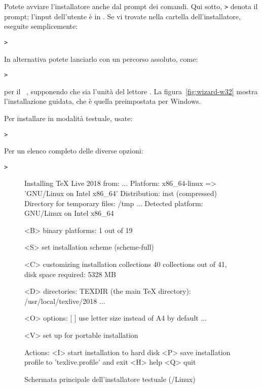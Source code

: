 \documentclass{article}
\begin{document}
Potete avviare l'installatore anche dal prompt dei comandi. Qui sotto,
\texttt{>} denota il prompt; l'input dell'utente è in
. Se vi trovate nella cartella dell'installatore,
eseguite semplicemente:
\begin{alltt}
> 
\end{alltt}

In alternativa potete lanciarlo con un percorso assoluto, come:
\begin{alltt}
> 
\end{alltt}
per il \DVD\ \TK, supponendo che  sia l'unità del lettore \DVD. La
figura~\ref{fig:wizard-w32} mostra l'installazione guidata, che è quella
preimpostata per Windows.

Per installare in modalità testuale, usate:
\begin{alltt}
> 
\end{alltt}

Per un elenco completo delle diverse opzioni:
\begin{alltt}
> 
\end{alltt}

\begin{figure}[tb]
\begin{boxedverbatim}
Installing TeX Live 2018 from: ...
Platform: x86_64-linux => 'GNU/Linux on Intel x86_64'
Distribution: inst (compressed)
Directory for temporary files: /tmp
...
 Detected platform: GNU/Linux on Intel x86_64

 <B> binary platforms: 1 out of 19

 <S> set installation scheme (scheme-full)

 <C> customizing installation collections
     40 collections out of 41, disk space required: 5328 MB

 <D> directories:
   TEXDIR (the main TeX directory):
     /usr/local/texlive/2018
   ...

 <O> options:
   [ ] use letter size instead of A4 by default
   ...

 <V> set up for portable installation

Actions:
 <I> start installation to hard disk
 <P> save installation profile to 'texlive.profile' and exit
 <H> help
 <Q> quit
\end{boxedverbatim}
\caption{Schermata principale dell'installatore testuale
  (\GNU/Linux)}\label{fig:text-main}
\end{figure}
\end{document}
